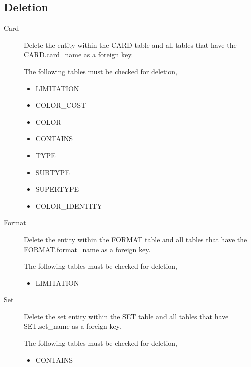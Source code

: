 \documentclass{article}
\begin{document}
\subsection{Deletion}
\begin{description}
    \item[Card]
        Delete the entity within the CARD table and all tables that have the CARD.card\_name as a foreign key.

        The following tables must be checked for deletion,
        \begin{multicols}{3}
            \begin{itemize}
                \item LIMITATION
                \item COLOR\_COST
                \item COLOR
                \item CONTAINS
                \item TYPE
                \item SUBTYPE
                \item SUPERTYPE
                \item COLOR\_IDENTITY
            \end{itemize}
        \end{multicols}
    \item[Format]
        Delete the entity within the FORMAT table and all tables that have the FORMAT.format\_name as a foreign key.

        The following tables must be checked for deletion,
        \begin{multicols}{3}
            \begin{itemize}
                \item LIMITATION
            \end{itemize}
        \end{multicols}
    \item[Set]
        Delete the set entity within the SET table and all tables that have SET.set\_name as a foreign key.

        The following tables must be checked for deletion,
        \begin{multicols}{3}
            \begin{itemize}
                \item CONTAINS
            \end{itemize}
        \end{multicols}
\end{description}
\end{document}
